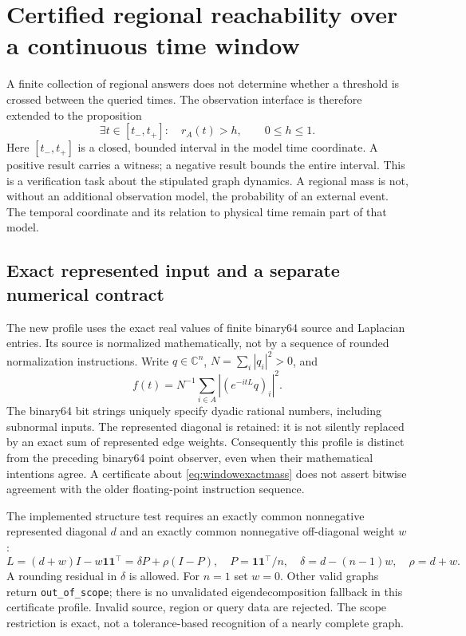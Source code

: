\documentclass[11pt,a4paper]{article}
\theoremstyle{definition}\newtheorem{definition}[theorem]{Definition}
\begin{document}
\section{Certified regional reachability over a continuous time window}\label{sec:windowreachability}
A finite collection of regional answers does not determine whether a threshold is crossed between the queried times. The observation interface is therefore extended to the proposition
\begin{equation}\label{eq:windowpredicate}
 \exists t\in[t_-,t_+]:\quad r_A(t)>h,\qquad 0\leq h\leq1.
\end{equation}
Here $[t_-,t_+]$ is a closed, bounded interval in the model time coordinate. A positive result carries a witness; a negative result bounds the entire interval. This is a verification task about the stipulated graph dynamics. A regional mass is not, without an additional observation model, the probability of an external event. The temporal coordinate and its relation to physical time remain part of that model.

\subsection{Exact represented input and a separate numerical contract}
The new profile uses the exact real values of finite binary64 source and Laplacian entries. Its source is normalized mathematically, not by a sequence of rounded normalization instructions. Write $q\in\mathbb C^n$, $N=\sum_i|q_i|^2>0$, and
\begin{equation}\label{eq:windowexactmass}
 f(t)=N^{-1}\sum_{i\in A}|(e^{-itL}q)_i|^2.
\end{equation}
The binary64 bit strings uniquely specify dyadic rational numbers, including subnormal inputs. The represented diagonal is retained: it is not silently replaced by an exact sum of represented edge weights. Consequently this profile is distinct from the preceding binary64 point observer, even when their mathematical intentions agree. A certificate about \eqref{eq:windowexactmass} does not assert bitwise agreement with the older floating-point instruction sequence.

The implemented structure test requires an exactly common nonnegative represented diagonal $d$ and an exactly common nonnegative off-diagonal weight $w$:
\begin{equation}\label{eq:windowclique}
 L=(d+w)I-w\boldsymbol1\boldsymbol1^\top
   =\delta P+\rho(I-P),\quad
 P=\boldsymbol1\boldsymbol1^\top/n,
 \quad\delta=d-(n-1)w,\quad\rho=d+w.
\end{equation}
A rounding residual in $\delta$ is allowed. For $n=1$ set $w=0$.
Other valid graphs return \texttt{out\_of\_scope}; there is no unvalidated eigendecomposition fallback in this certificate profile. Invalid source, region or query data are rejected. The scope restriction is exact, not a tolerance-based recognition of a nearly complete graph.
\end{document}
